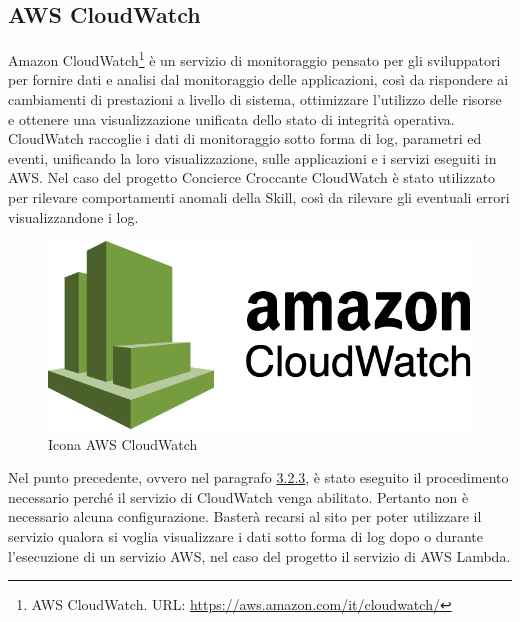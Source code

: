 \subsection{AWS CloudWatch}
Amazon CloudWatch\footnote{AWS CloudWatch. URL: \href{https://aws.amazon.com/it/cloudwatch/}{https://aws.amazon.com/it/cloudwatch/}} è un servizio di monitoraggio pensato per gli sviluppatori per fornire dati e analisi dal monitoraggio delle applicazioni, così da rispondere ai cambiamenti di prestazioni a livello di sistema, ottimizzare l'utilizzo delle risorse e ottenere una visualizzazione unificata dello stato di integrità operativa. CloudWatch raccoglie i dati di monitoraggio sotto forma di log, parametri ed eventi, unificando la loro visualizzazione, sulle applicazioni e i servizi eseguiti in AWS. Nel caso del progetto Concierce Croccante CloudWatch è stato utilizzato per rilevare comportamenti anomali della Skill, così da rilevare gli eventuali errori visualizzandone i log.
\begin{figure}[H] 
    \centering 
    \includegraphics[width=0.8\columnwidth]{immagini/amazon-cloudwatch.png}
    \caption{\label{fig:icona_aws_cloudwatch}Icona AWS CloudWatch}
\end{figure}
\noindent Nel punto precedente, ovvero nel paragrafo \hyperref[aws-iam]{3.2.3}, è stato eseguito il procedimento necessario perché il servizio di CloudWatch venga abilitato. Pertanto non è necessario alcuna configurazione. Basterà recarsi al sito per poter utilizzare il servizio qualora si voglia visualizzare i dati sotto forma di log dopo o durante l'esecuzione di un servizio AWS, nel caso del progetto il servizio di AWS Lambda.

